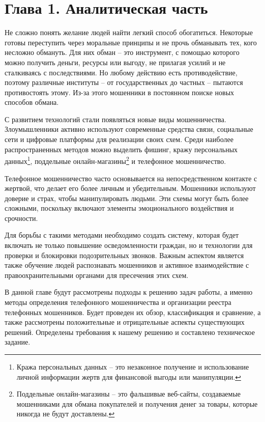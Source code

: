 \section*{\centering Глава 1. Аналитическая часть}

Не сложно понять желание людей найти легкий способ обогатиться. Некоторые готовы переступить через моральные принципы и не прочь обманывать тех, кого несложно обмануть. Для них обман -- это инструмент, с помощью которого можно получить деньги, ресурсы или выгоду, не прилагая усилий и не сталкиваясь с последствиями. Но любому действию есть противодействие, поэтому различные институты -- от государственных до частных -- пытаются противостоять этому. Из-за этого мошенники в постоянном поиске новых способов обмана. 

С развитием технологий стали появляться новые виды мошенничества. Злоумышленники активно используют современные средства связи, социальные сети и цифровые платформы для реализации своих схем. Среди наиболее распространенных методов можно выделить фишинг, кражу персональных данных\footnote{Кража персональных данных -- это незаконное получение и использование личной информации жертв для финансовой выгоды или манипуляции.}, поддельные онлайн-магазины\footnote{Поддельные онлайн-магазины -- это фальшивые веб-сайты, создаваемые мошенниками для обмана покупателей и получения денег за товары, которые никогда не будут доставлены.} и телефонное мошенничество.

Телефонное мошенничество часто основывается на непосредственном контакте с жертвой, что делает его более личным и убедительным. Мошенники используют доверие и страх, чтобы манипулировать людьми. Эти схемы могут быть более сложными, поскольку включают элементы эмоционального воздействия и срочности.

Для борьбы с такими методами необходимо создать систему, которая будет включать не только повышение осведомленности граждан, но и технологии для проверки и блокировки подозрительных звонков. Важным аспектом является также обучение людей распознавать мошенников и активное взаимодействие с правоохранительными органами для пресечения этих схем.

В данной главе будут рассмотрены подходы к решению задач работы, а именно методы определения телефонного мошенничества и организации реестра телефонных мошенников. Будет проведен их обзор, классификация и сравнение, а также рассмотрены положительные и отрицательные аспекты существующих решений. Определены требования к нашему решению и составлено техническое задание.

